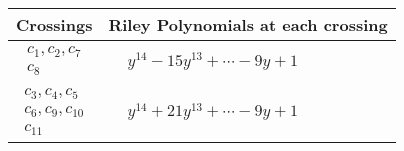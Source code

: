 \documentclass[1p]{elsarticle_modified}
\theoremstyle{definition}
\begin{document}
\begin{tabular}{m{50pt}|m{274pt}}
Crossings & \hspace{64pt}Riley Polynomials at each crossing \\
\hline $$\begin{aligned}c_{1},c_{2},c_{7}\\c_{8}\end{aligned}$$&$\begin{aligned}
&y^{14}-15 y^{13}+\cdots-9 y+1
\end{aligned}$\\
\hline $$\begin{aligned}c_{3},c_{4},c_{5}\\c_{6},c_{9},c_{10}\\c_{11}\end{aligned}$$&$\begin{aligned}
&y^{14}+21 y^{13}+\cdots-9 y+1
\end{aligned}$\\
\hline
\end{tabular}
\vskip 2pc
\end{document}
